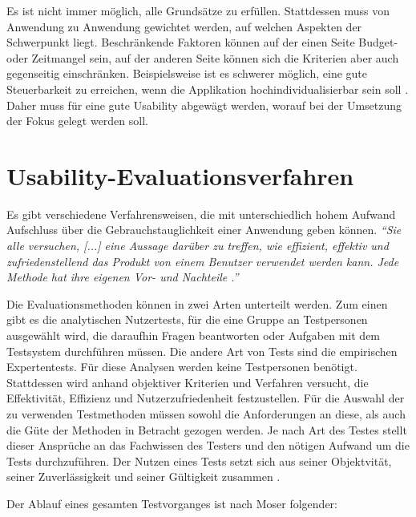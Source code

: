 Es ist nicht immer möglich, alle Grundsätze zu erfüllen. Stattdessen muss von Anwendung zu Anwendung gewichtet werden, auf welchen Aspekten der Schwerpunkt liegt. Beschränkende Faktoren können auf der einen Seite Budget- oder Zeitmangel sein, auf der anderen Seite können sich die Kriterien aber auch gegenseitig einschränken. Beispielsweise ist es schwerer möglich, eine gute Steuerbarkeit zu erreichen, wenn die Applikation hochindividualisierbar sein soll \cite[S. 8]{DIN2006}. Daher muss für eine gute Usability abgewägt werden, worauf bei der Umsetzung der Fokus gelegt werden soll.

\section{Usability-Evaluationsverfahren} \label{sec:methods}
Es gibt verschiedene Verfahrensweisen, die mit unterschiedlich hohem Aufwand Aufschluss über die Gebrauchstauglichkeit einer Anwendung geben können. \textit{\enquote{Sie alle versuchen, [...] eine Aussage darüber zu treffen, wie effizient, effektiv und zufriedenstellend das Produkt von einem Benutzer verwendet werden kann. Jede Methode hat ihre eigenen Vor- und Nachteile \cite[S. 224]{Moser2012}.}}\par
Die Evaluationsmethoden können in zwei Arten unterteilt werden. Zum einen gibt es die analytischen Nutzertests, für die eine Gruppe an Testpersonen ausgewählt wird, die daraufhin Fragen beantworten oder Aufgaben mit dem Testsystem durchführen müssen. Die andere Art von Tests sind die empirischen Expertentests. Für diese Analysen werden keine Testpersonen benötigt. Stattdessen wird anhand objektiver Kriterien und Verfahren versucht, die Effektivität, Effizienz und Nutzerzufriedenheit festzustellen. Für die Auswahl der zu verwenden Testmethoden müssen sowohl die Anforderungen an diese, als auch die Güte der Methoden in Betracht gezogen werden. Je nach Art des Testes stellt dieser Ansprüche an das Fachwissen des Testers und den nötigen Aufwand um die Tests durchzuführen. Der Nutzen eines Tests setzt sich aus seiner Objektvität, seiner Zuverlässigkeit und seiner Gültigkeit zusammen \cite[S. 224 f.]{Moser2012}.\par
Der Ablauf eines gesamten Testvorganges ist nach Moser folgender:
